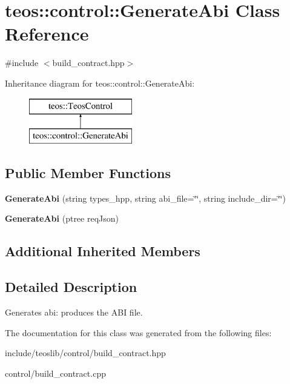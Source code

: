 \hypertarget{classteos_1_1control_1_1_generate_abi}{}\section{teos\+:\+:control\+:\+:Generate\+Abi Class Reference}
\label{classteos_1_1control_1_1_generate_abi}


{\ttfamily \#include $<$build\+\_\+contract.\+hpp$>$}

Inheritance diagram for teos\+:\+:control\+:\+:Generate\+Abi\+:\begin{figure}[H]
\begin{center}
\leavevmode
\includegraphics[height=2.000000cm]{classteos_1_1control_1_1_generate_abi}
\end{center}
\end{figure}
\subsection*{Public Member Functions}
\begin{DoxyCompactItemize}
\item 
\mbox{\label{classteos_1_1control_1_1_generate_abi_a3306abc2a6f87517aad41efd9ea4ca7e}} 
{\bfseries Generate\+Abi} (string types\+\_\+hpp, string abi\+\_\+file=\char`\"{}\char`\"{}, string include\+\_\+dir=\char`\"{}\char`\"{})
\item 
\mbox{\label{classteos_1_1control_1_1_generate_abi_ace9ac4a1154f562eb3bb00ff0bc92476}} 
{\bfseries Generate\+Abi} (ptree req\+Json)
\end{DoxyCompactItemize}
\subsection*{Additional Inherited Members}


\subsection{Detailed Description}
Generates abi\+: produces the A\+BI file. 

The documentation for this class was generated from the following files\+:\begin{DoxyCompactItemize}
\item 
include/teoslib/control/build\+\_\+contract.\+hpp\item 
control/build\+\_\+contract.\+cpp\end{DoxyCompactItemize}

